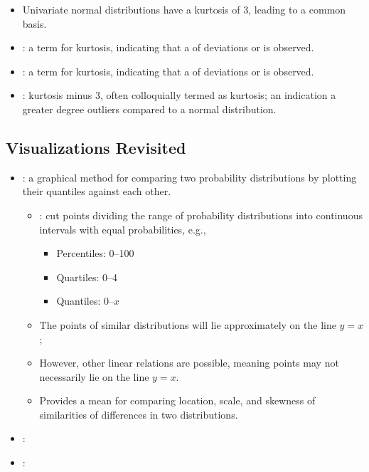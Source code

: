 \begin{itemize}
\begin{itemize}
\begin{itemize}
          \begin{itemize}
            \item Univariate normal distributions have a kurtosis of 3, leading to a common basis.
            \item {}: a term for  kurtosis, indicating that a  of deviations or  is observed.
            \item {}: a term for  kurtosis, indicating that a  of deviations or  is observed. 
            \item {}: kurtosis minus 3, often colloquially termed as kurtosis; an indication a greater degree outliers compared to a normal distribution. 
          \end{itemize}
      \end{itemize} 
  \end{itemize}
  
  \subsection{Visualizations Revisited}
  \begin{itemize}
    \item {}: a graphical method for comparing two probability distributions by plotting their quantiles against each other. 
      \begin{itemize}
        \item {}: cut points dividing the range of probability distributions into continuous intervals with equal probabilities, e.g.,
          \begin{itemize}
            \item Percentiles: 0--100
            \item Quartiles: 0--4
            \item Quantiles: 0--\(x\)
          \end{itemize}
        \item The points of similar distributions will lie approximately on the line \(y=x\); 
        \item However, other linear relations are possible, meaning points may not necessarily lie on the line \(y=x\).
        \item Provides a mean for comparing location, scale, and skewness of similarities of differences in two distributions.
      \end{itemize}
    \item {}:
    \item {}:
  \end{itemize}
  
\end{itemize}
